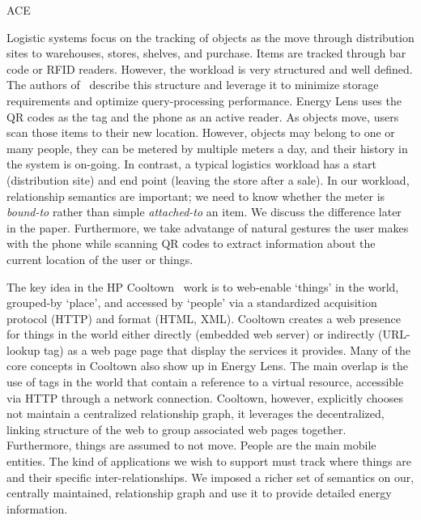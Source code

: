 ACE~\cite{ACE}

Logistic systems focus on the tracking of objects as the move through distribution sites to warehouses, stores, shelves,
and purchase.  Items are tracked through bar code or RFID readers.  However, the workload is very structured and well
defined.  The authors of~\cite{rfid_gonz2006} describe this structure and leverage it to minimize storage
requirements and optimize query-processing performance.  Energy Lens uses the QR codes as the tag and the phone as an active
reader.  As objects move, users scan those items to their new location.  However, objects may belong to one or
many people, they can be metered by multiple meters a day, and their history in the system
is on-going.  In contrast, a typical logistics workload has a start (distribution site) and end point (leaving the store
after a sale).  In our workload, relationship semantics are important; we need to know whether the meter is \emph{bound-to}
rather than simple \emph{attached-to} an item.  We discuss the difference later in the paper.
Furthermore, we take advatange of natural gestures the user makes with the phone while scanning QR codes to extract
information about the current location of the user or things.

The key idea in the HP Cooltown~\cite{bridgingphysical,cooltown} work is to web-enable `things' in the world, grouped-by
`place', and accessed by `people' via a standardized acquisition protocol (HTTP) and format (HTML, XML).  
Cooltown creates a web presence for things in the world either directly (embedded web server) or indirectly 
(URL-lookup tag) as a web page page that display the services it provides.  Many of the core concepts in Cooltown 
also show up in Energy Lens.  The main overlap is the use of tags in the world that contain a reference to a virtual 
resource, accessible via HTTP through
a network connection.  Cooltown, however, explicitly chooses not maintain a centralized relationship
graph, it leverages the decentralized, linking structure of the web to group associated web pages together.
Furthermore, things are assumed to not move.  People are the main mobile entities.  The kind of applications
we wish to support must track where things are and their specific inter-relationships.  We imposed a richer set of 
semantics on our, centrally maintained, relationship graph and use it to provide detailed energy information.

